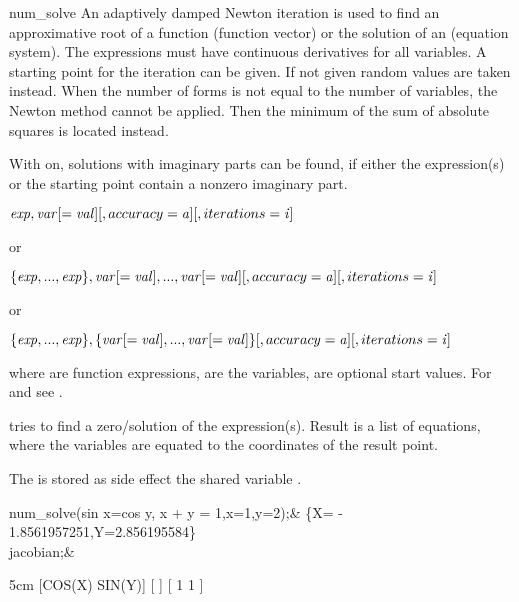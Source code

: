 \begin{Operator}{num_solve}
An adaptively damped Newton iteration is used to find
an approximative root of a function (function vector) or the 
solution of an  (equation system). The expressions
must have continuous derivatives for all variables.
A starting point for the iteration can be given. If not given
random values are taken instead. When the number of
forms is not equal to the number of variables, the
Newton method cannot be applied. Then the minimum
of the sum of absolute squares is located instead. 

With  on, solutions with imaginary parts can be
found, if either the expression(s) or the starting point
contain a nonzero imaginary part. 

\begin{Syntax}
 \(\meta{exp}, \meta{var}[=\meta{val}][,accuracy=\meta{a}][,iterations=\meta{i}]\)

or

 \(\{\meta{exp},...,\meta{exp}\}, \meta{var}[=\meta{val}],...,\meta{var}[=\meta{val}]
                [,accuracy=\meta{a}][,iterations=\meta{i}]\)

or

 \(\{\meta{exp},...,\meta{exp}\}, \{\meta{var}[=\meta{val}],...,\meta{var}[=\meta{val}]\}
                [,accuracy=\meta{a}][,iterations=\meta{i}]\)
 
\end{Syntax} 


where  are function expressions,
       are the variables,
       are optional start values.
For  and  see .
 
 tries to find a zero/solution of the expression(s).
Result is a list of equations, where the variables are
equated to the coordinates of the result point.
 
The  is stored as side effect the shared
variable .

 
\begin{Examples}
num_solve({sin x=cos y, x + y = 1},{x=1,y=2});&
   \{X= - 1.8561957251,Y=2.856195584\}\\
jacobian;&
\begin{multilineoutput}{5cm}
    [COS(X)  SIN(Y)]
    [              ]
    [  1       1   ]
\end{multilineoutput}
\end{Examples}
\end{Operator}

